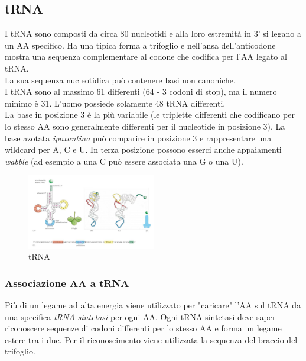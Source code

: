     \subsection{tRNA}
        I tRNA sono composti da circa 80 nucleotidi e alla loro estremità in 3' si legano a un AA specifico. Ha una tipica forma a trifoglio e nell'ansa dell'anticodone mostra una sequenza complementare al codone che codifica per l'AA legato al tRNA.\\
        La sua sequenza nucleotidica può contenere basi non canoniche. \\
        I tRNA sono al massimo 61 differenti (64 - 3 codoni di stop), ma il numero minimo è 31. L'uomo possiede solamente 48 tRNA differenti.\\
        La base in posizione 3 è la più variabile (le triplette differenti che codificano per lo stesso AA sono generalmente differenti per il nucleotide in posizione 3). La base azotata \textit{ipoxantina} può comparire in posizione 3 e rappresentare una wildcard per A, C e U. In terza posizione possono esserci anche appaiamenti \textit{wabble} (ad esempio a una C può essere associata una G o una U).
        \begin{figure}[h]
                \centering
                \includegraphics[width=0.5\textwidth]{images/tRNA.JPG}
                \caption{\small tRNA}
                \label{fig:mesh1}
        \end{figure}
    
        \subsubsection{Associazione AA a tRNA}
            Più di un legame ad alta energia viene utilizzato per "caricare" l'AA sul tRNA da una specifica \textit{tRNA sintetasi} per ogni AA. 
            Ogni tRNA sintetasi deve saper riconoscere sequenze di codoni differenti per lo stesso AA e forma un legame estere tra i due. Per il riconoscimento viene utilizzata la sequenza del braccio del trifoglio. 
         

